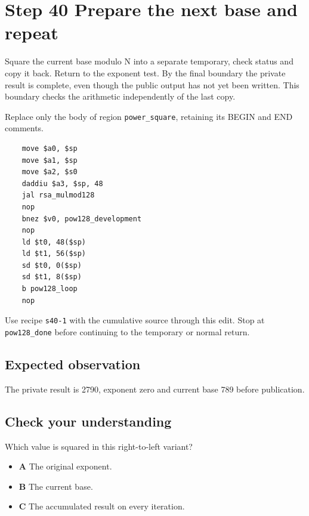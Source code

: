 \section{Step 40 Prepare the next base and repeat}\label{rsa-s40}

Square the current base modulo N into a separate temporary, check status and copy it back. Return to the exponent test. By the final boundary the private result is complete, even though the public output has not yet been written. This boundary checks the arithmetic independently of the last copy.

Replace only the body of region \texttt{power\_square}, retaining its BEGIN and END comments.

\begin{verbatim}
    move $a0, $sp
    move $a1, $sp
    move $a2, $s0
    daddiu $a3, $sp, 48
    jal rsa_mulmod128
    nop
    bnez $v0, pow128_development
    nop
    ld $t0, 48($sp)
    ld $t1, 56($sp)
    sd $t0, 0($sp)
    sd $t1, 8($sp)
    b pow128_loop
    nop
\end{verbatim}

Use recipe \texttt{s40-1} with the cumulative source through this edit. Stop at \texttt{pow128\_done} before continuing to the temporary or normal return.

\subsection{Expected observation}
The private result is 2790, exponent zero and current base 789 before publication.

\subsection{Check your understanding}
Which value is squared in this right-to-left variant?

\begin{itemize}
\item \textbf{A} The original exponent.
\item \textbf{B} The current base.
\item \textbf{C} The accumulated result on every iteration.
\end{itemize}
